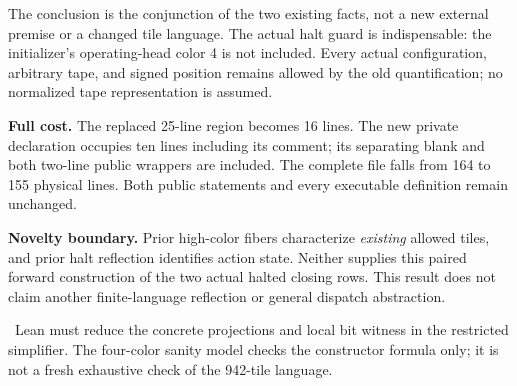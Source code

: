 The conclusion is the conjunction of the two existing facts, not a new external premise or a changed tile language. The actual halt guard is indispensable: the initializer's operating-head color 4 is not included. Every actual configuration, arbitrary tape, and signed position remains allowed by the old quantification; no normalized tape representation is assumed.

\textbf{Full cost.} The replaced 25-line region becomes 16 lines. The new private declaration occupies ten lines including its comment; its separating blank and both two-line public wrappers are included. The complete file falls from 164 to 155 physical lines. Both public statements and every executable definition remain unchanged.

\textbf{Novelty boundary.} Prior high-color fibers characterize \emph{existing} allowed tiles, and prior halt reflection identifies action state. Neither supplies this paired forward construction of the two actual halted closing rows. This result does not claim another finite-language reflection or general dispatch abstraction.

\risk\ Lean must reduce the concrete  projections and local bit witness in the restricted simplifier. The four-color sanity model checks the constructor formula only; it is not a fresh exhaustive check of the 942-tile language. \status
